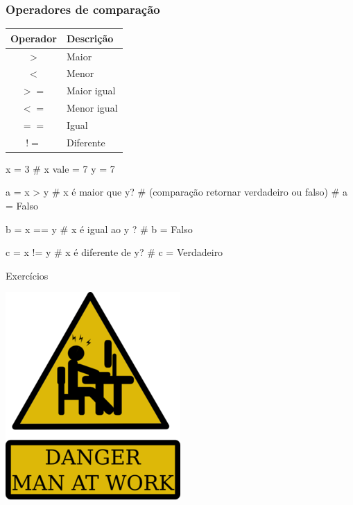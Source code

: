 \documentclass{beamer}
\begin{document}
\begin{frame}[fragile]

  \frametitle{Operadores de comparação}

  \begin{center}
    \scriptsize
    \begin{tabular}{|c|l}
    Operador  & Descrição  \\ \hline
    $>$     & Maior \\                        
    $<$     & Menor \\ 
    $>=$     & Maior igual  \\
    $<=$    & Menor igual  \\
    $==$    & Igual \\
    $!=$    & Diferente
    \end{tabular}
  \end{center}
\end{frame}
  
\begin{frame}[fragile]
\begin{python}
x = 3   # x vale = 7
y = 7

a = x > y	# x é maior que y? 
		# (comparação retornar verdadeiro ou falso)
# a = Falso

b = x == y	# x é igual ao y ?
# b = Falso

c = x != y	# x é diferente de y?
# c = Verdadeiro

\end{python} 
\end{frame}

\begin{frame}{Exercícios}
 \begin{center}
  \includegraphics[scale=0.8]{./figures/man_at_work.png}
 \end{center}
\end{frame}
\end{document}
